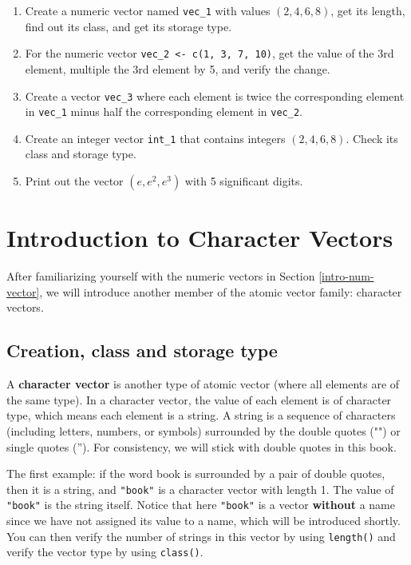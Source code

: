 \documentclass[
]{book}
\begin{document}
\begin{enumerate}
\def\labelenumi{\arabic{enumi}.}
\item
  Create a numeric vector named \texttt{vec\_1} with values \((2, 4, 6, 8)\), get its length, find out its class, and get its storage type.
\item
  For the numeric vector \texttt{vec\_2\ \textless{}-\ c(1,\ 3,\ 7,\ 10)}, get the value of the 3rd element, multiple the 3rd element by 5, and verify the change.
\item
  Create a vector \texttt{vec\_3} where each element is twice the corresponding element in \texttt{vec\_1} minus half the corresponding element in \texttt{vec\_2}.
\item
  Create an integer vector \texttt{int\_1} that contains integers \((2, 4, 6, 8)\). Check its class and storage type.
\item
  Print out the vector \((e, e^2, e^3)\) with 5 significant digits.
\end{enumerate}

\hypertarget{intro-char-vector}{%
\section{Introduction to Character Vectors}\label{intro-char-vector}}

After familiarizing yourself with the numeric vectors in Section \ref{intro-num-vector}, we will introduce another member of the atomic vector family: character vectors.

\hypertarget{create-character-vector}{%
\subsection{Creation, class and storage type}\label{create-character-vector}}

A \textbf{character vector} is another type of atomic vector (where all elements are of the same type). In a character vector, the value of each element is of character type, which means each element is a string. A string is a sequence of characters (including letters, numbers, or symbols) surrounded by the double quotes ("") or single quotes (''). For consistency, we will stick with double quotes in this book.

The first example: if the word book is surrounded by a pair of double quotes, then it is a string, and \texttt{"book"} is a character vector with length 1. The value of \texttt{"book"} is the string itself. Notice that here \texttt{"book"} is a vector \textbf{without} a name since we have not assigned its value to a name, which will be introduced shortly. You can then verify the number of strings in this vector by using \texttt{length()} and verify the vector type by using \texttt{class()}.
\end{document}
